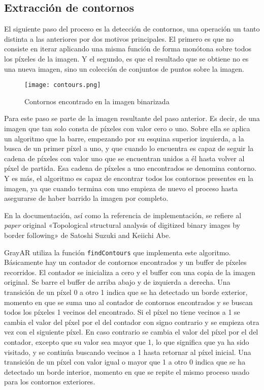 \subsection{Extracción de contornos}
El siguiente paso del proceso es la detección de contornos, una operación un tanto distinta a las anteriores por dos motivos principales. El primero es que no consiste en iterar aplicando una misma función de forma monótona sobre todos los píxeles de la imagen. Y el segundo, es que el resultado que se obtiene no es una nueva imagen, sino un colección de conjuntos de puntos sobre la imagen.

\begin{figure}[h] 
  \centering
  \texttt{[image: contours.png]}
  \caption{Contornos encontrado en la imagen binarizada}
  \label{fig:contours}
\end{figure}

Para este paso se parte de la imagen resultante del paso anterior. Es decir, de una imagen que tan solo consta de píxeles con valor cero o uno. Sobre ella se aplica un algoritmo que la barre, empezando por su esquina superior izquierda, a la busca de un primer píxel a uno, y que cuando lo
encuentra es capaz de seguir la cadena de píxeles con valor uno que se encuentran unidos a él hasta volver al píxel de partida. Esa cadena de píxeles a uno encontrados se denomina contorno. Y es más, el algoritmo es capaz de encontrar todos los contornos presentes en la imagen, ya que cuando termina con uno empieza de nuevo el proceso hasta asegurarse de haber barrido la imagen por completo.

En la documentación, así como la referencia de implementación, se refiere al \textit{paper} original «Topological structural analysis of digitized binary images by border following» de Satoshi Suzuki and Keiichi Abe. 

GrayAR utiliza la función \texttt{findContours} que implementa este algoritmo. Básicamente hay un contador de contornos encontrados y un buffer de píxeles recorridos. El contador se inicializa a cero y el buffer con una copia de la imagen original. Se barre el buffer de arriba abajo y de izquierda a derecha. Una transición de un píxel 0 a otro 1 indica que se ha detectado un borde exterior, momento en que se suma uno al contador de contornos encontrados y se buscan todos los píxeles 1 vecinos del encontrado. Si el píxel no tiene vecinos a 1 se cambia el valor del píxel por el del contador con signo contrario y se empieza otra vez con el siguiente píxel. En caso
contrario se cambia el valor del píxel por el del contador, excepto que su valor sea mayor que 1, lo que significa que ya ha sido visitado, y se continúa buscando vecinos a 1 hasta retornar al píxel inicial. Una transición de un píxel con valor igual o mayor que 1 a otro 0 indica que se ha
detectado un borde interior, momento en que se repite el mismo proceso usado para los contornos exteriores.

